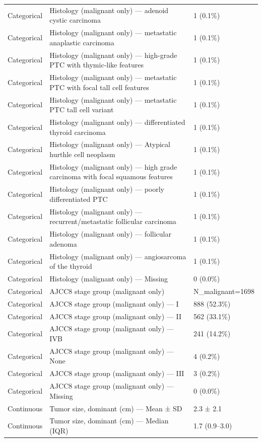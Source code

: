 \begin{table}[htbp]
\begin{tabular}{lll}
Categorical & Histology (malignant only) — adenoid cystic carcinoma & 1 (0.1\%) \\
Categorical & Histology (malignant only) — metastatic anaplastic carcinoma & 1 (0.1\%) \\
Categorical & Histology (malignant only) — high-grade PTC with thymic-like features & 1 (0.1\%) \\
Categorical & Histology (malignant only) — metastatic PTC with focal tall cell features & 1 (0.1\%) \\
Categorical & Histology (malignant only) — metastatic PTC tall cell variant & 1 (0.1\%) \\
Categorical & Histology (malignant only) — differentiated thyroid carcinoma & 1 (0.1\%) \\
Categorical & Histology (malignant only) — Atypical hurthle cell neoplasm & 1 (0.1\%) \\
Categorical & Histology (malignant only) — high grade carcinoma with focal squamous features & 1 (0.1\%) \\
Categorical & Histology (malignant only) — poorly differentiated PTC & 1 (0.1\%) \\
Categorical & Histology (malignant only) — recurrent/metastatic follicular carcinoma & 1 (0.1\%) \\
Categorical & Histology (malignant only) — follicular adenoma & 1 (0.1\%) \\
Categorical & Histology (malignant only) — angiosarcoma of the thyroid & 1 (0.1\%) \\
Categorical & Histology (malignant only) — Missing & 0 (0.0\%) \\
Categorical & AJCC8 stage group (malignant only) & N\_malignant=1698 \\
Categorical & AJCC8 stage group (malignant only) — I & 888 (52.3\%) \\
Categorical & AJCC8 stage group (malignant only) — II & 562 (33.1\%) \\
Categorical & AJCC8 stage group (malignant only) — IVB & 241 (14.2\%) \\
Categorical & AJCC8 stage group (malignant only) — None & 4 (0.2\%) \\
Categorical & AJCC8 stage group (malignant only) — III & 3 (0.2\%) \\
Categorical & AJCC8 stage group (malignant only) — Missing & 0 (0.0\%) \\
Continuous & Tumor size, dominant (cm) — Mean ± SD & 2.3 ± 2.1 \\
Continuous & Tumor size, dominant (cm) — Median (IQR) & 1.7 (0.9–3.0) \\

\end{tabular}
\end{table}
